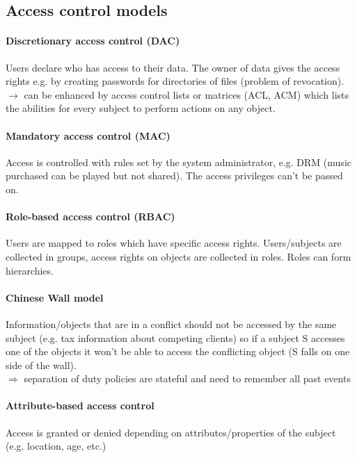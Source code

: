 \documentclass[12pt]{article}
\begin{document}
	\subsection{Access control models}
	\paragraph{Discretionary access control (DAC)} Users declare who has access to their data. The owner of data gives the access rights e.g. by creating passwords for directories of files (problem of revocation). $\rightarrow$ can be enhanced by access control lists or matrices (ACL, ACM) which lists the abilities for every subject to perform actions on any object.
	
	\paragraph{Mandatory access control (MAC)} Access is controlled with rules set by the system administrator, e.g. DRM (music purchased can be played but not shared). The access privileges can't be passed on.
	
	\paragraph{Role-based access control (RBAC)} Users are mapped to roles which have specific access rights. Users/subjects are collected in groups, access rights on objects are collected in roles. Roles can form hierarchies.
	
	\paragraph{Chinese Wall model} Information/objects that are in a conflict should not be accessed by the same subject (e.g. tax information about competing clients) so if a subject S accesses one of the objects it won't be able to access the conflicting object (S falls on one side of the wall).\\
	$\Rightarrow$ separation of duty policies are stateful and need to remember all past events
	
	\paragraph{Attribute-based access control} Access is granted or denied depending on attributes/properties of the subject (e.g. location, age, etc.)
	
\end{document}
